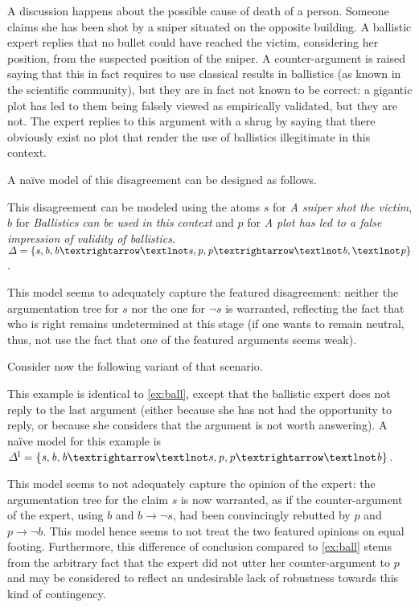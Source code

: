 \documentclass[version=3.21, pagesize, twoside=off, bibliography=totoc, DIV=calc, fontsize=12pt, a4paper, french, english]{scrartcl}
\begin{document}
\begin{example}
	\label{ex:ball}
	A discussion happens about the possible cause of death of a person. Someone claims she has been shot by a sniper situated on the opposite building. A ballistic expert replies that no bullet could have reached the victim, considering her position, from the suspected position of the sniper. A counter-argument is raised saying that this in fact requires to use classical results in ballistics (as known in the scientific community), but they are in fact not known to be correct: a gigantic plot has led to them being falsely viewed as empirically validated, but they are not. The expert replies to this argument with a shrug by saying that there obviously exist no plot that render the use of ballistics illegitimate in this context.
\end{example}
A naïve model of this disagreement can be designed as follows.
\begin{example}
	\label{ex:ball1}
	This disagreement can be modeled using the atoms $\mathit{s}$ for \emph{A sniper shot the victim}, $\mathit{b}$ for \emph{Ballistics can be used in this context} and $\mathit{p}$ for \emph{A plot has led to a false impression of validity of ballistics}.
	$\Delta = \set{\mathit{s},\allowbreak \mathit{b}, \mathit{b} → ¬\mathit{s}, \mathit{p}, \mathit{p} → ¬\mathit{b}, ¬\mathit{p}}$.
\end{example}
This model seems to adequately capture the featured disagreement: neither the argumentation tree for $\mathit{s}$ nor the one for $¬\mathit{s}$ is warranted, reflecting the fact that who is right remains undetermined at this stage (if one wants to remain neutral, thus, not use the fact that one of the featured arguments seems weak).

Consider now the following variant of that scenario.
\begin{example}
	\label{ex:ball2}
	This example is identical to \cref{ex:ball}, except that the ballistic expert does not reply to the last argument (either because she has not had the opportunity to reply, or because she considers that the argument is not worth answering). A naïve model for this example is $\Delta^\text{l} = \set{\mathit{s},\allowbreak \mathit{b}, \mathit{b} → ¬\mathit{s}, \mathit{p}, \mathit{p} → ¬\mathit{b}}$.
\end{example}
This model seems to not adequately capture the opinion of the expert: the argumentation tree for the claim $\mathit{s}$ is now warranted, as if the counter-argument of the expert, using $\mathit{b}$ and $\mathit{b} → ¬\mathit{s}$, had been convincingly rebutted by $\mathit{p}$ and $\mathit{p} → ¬\mathit{b}$. This model hence seems to not treat the two featured opinions on equal footing. Furthermore, this difference of conclusion compared to \cref{ex:ball} stems from the arbitrary fact that the expert did not utter her counter-argument to $\mathit{p}$ and may be considered to reflect an undesirable lack of robustness towards this kind of contingency.
\end{document}
